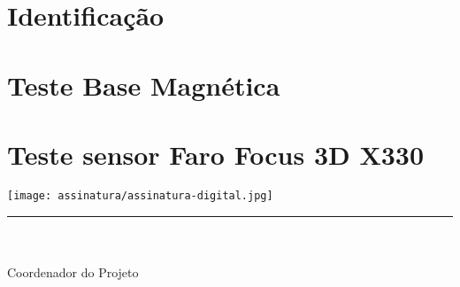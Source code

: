 \documentclass[12pt,a4paper]{article}
\begin{document}



\newpage%



\section{Identificação}



\newpage%
\section{Teste Base Magnética}


\section{Teste sensor Faro Focus 3D X330}





\vspace{20mm}%
\parbox[t]{70mm}{
  \centering
  \texttt{[image: assinatura/assinatura-digital.jpg]} \\[-4mm]
  \rule[2mm]{70mm}{0.1mm} \\
  \ramon \\[1mm]
  Coordenador do Projeto \\
}
\end{document}
